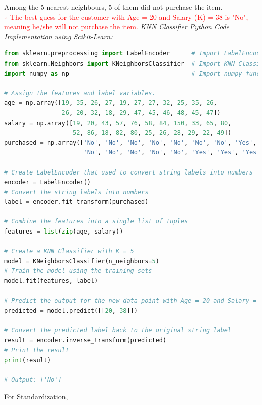 \documentclass{book}
\begin{document}
Among the 5-nearest neighbours, 5 of them did not purchase the item.\\
\textcolor{red}{$\therefore$ The best guess for the customer with Age = 20 and Salary (K) = 38 is "No", meaning he/she will not purchase the item.}
\newpage
\textit{\large{KNN Classifier Python Code Implementation using Scikit-Learn:}}
\begin{lstlisting}[language=Python, basicstyle=\ttfamily\small, keywordstyle=\color{blue}, commentstyle=\color{forestgreen}, stringstyle=\color{red}]
from sklearn.preprocessing import LabelEncoder      # Import LabelEncoder functions
from sklearn.Neighbors import KNeighborsClassifier  # Import KNN Classifier functions
import numpy as np                                  # Import numpy functions

# Assign the features and label variables.
age = np.array([19, 35, 26, 27, 19, 27, 27, 32, 25, 35, 26,
                26, 20, 32, 18, 29, 47, 45, 46, 48, 45, 47])
salary = np.array([19, 20, 43, 57, 76, 58, 84, 150, 33, 65, 80,
                   52, 86, 18, 82, 80, 25, 26, 28, 29, 22, 49])
purchased = np.array(['No', 'No', 'No', 'No', 'No', 'No', 'No', 'Yes', 'No', 'No', 'No',
                      'No', 'No', 'No', 'No', 'No', 'Yes', 'Yes', 'Yes', 'Yes', 'Yes', 'Yes'])

# Create LabelEncoder that used to convert string labels into numbers
encoder = LabelEncoder()
# Convert the string labels into numbers
label = encoder.fit_transform(purchased)

# Combine the features into a single list of tuples
features = list(zip(age, salary))

# Create a KNN Classifier with K = 5
model = KNeighborsClassifier(n_neighbors=5)
# Train the model using the training sets
model.fit(features, label)

# Predict the output for the new data point with Age = 20 and Salary = 38
predicted = model.predict([[20, 38]])

# Convert the predicted label back to the original string label
result = encoder.inverse_transform(predicted)
# Print the result
print(result)

# Output: ['No']
\end{lstlisting}
\vspace{5mm}
For Standardization, 
\end{document}
